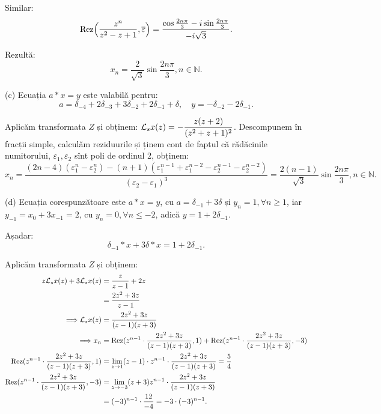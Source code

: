 Similar: 
\[
  \mathrm{Rez} \Big( \dfrac{z^n}{z^2 - z + 1}, \overline{\varepsilon} \Big) 
  = \dfrac{\cos \frac{2n\pi}{3} - i \sin \frac{2 n \pi}{3}}{-i\sqrt{3}}.
\]

Rezultă: 
\[
  x_n = \dfrac{2}{\sqrt{3}} \sin \dfrac{2n\pi}{3}, n \in \mathbb{N}.
\]

(c) Ecuația $a \ast x = y$ este valabilă pentru: 
\[
  a = \delta_{-4} + 2 \delta_{-3} + 3 \delta_{-2} + 2 \delta_{-1} + \delta, 
  \quad y = -\delta_{-2} - 2 \delta_{-1}.
\]

Aplicăm transformata $Z$ și obținem: 
$\mathcal{L}_s x(z) = - \dfrac{z(z+2)}{(z^2 + z + 1)^2}$. Descompunem în fracții 
simple, calculăm reziduurile și ținem cont de faptul că rădăcinile numitorului, 
$\varepsilon_1, \varepsilon_2$ sînt poli de ordinul 2, obținem: 
\[
  x_n = \dfrac{(2n-4)(\varepsilon_1^n - \varepsilon_2^n) - 
    (n+1)(\varepsilon_1^{n-1} + \varepsilon_1^{n-2} - \varepsilon_2^{n-1} - 
    \varepsilon_2^{n-2})}{(\varepsilon_2 - \varepsilon_1)^3} 
  = \dfrac{2(n-1)}{\sqrt{3}} \sin \dfrac{2 n \pi}{3}, n \in \mathbb{N}.
\]

(d) Ecuația corespunzătoare este $a \ast x = y$, cu $a = \delta_{-1} + 3 \delta$ și 
$y_n = 1, \forall n \geq 1$, iar $y_{-1} = x_0 + 3 x_{-1} = 2$, cu 
$y_n = 0, \forall n \leq -2$, adică $y = 1 + 2 \delta_{-1}$.

Așadar: 
\[
  \delta_{-1} \ast x + 3 \delta \ast x = 1 + 2 \delta_{-1}.
\]

Aplicăm transformata $Z$ și obținem:
\begin{align*}
  z \mathcal{L}_s x(z) + 3 \mathcal{L}_s x(z) &= \dfrac{z}{z-1} + 2z \\
                                &= \dfrac{2z^2 + 3z}{z-1} \\
  \Longrightarrow \mathcal{L}_s x(z) &= \dfrac{2z^2 + 3z}{(z-1)(z+3)} \\
  \Longrightarrow x_n &= \mathrm{Rez}(z^{n-1} \cdot \dfrac{2z^2 + 3z}{(z-1)(z+3)}, 1) + 
                        \mathrm{Rez} (z^{n-1} \cdot \dfrac{2z^2 + 3z}{(z-1)(z+3)}, -3) \\
  \mathrm{Rez}(z^{n-1} \cdot \dfrac{2z^2 + 3z}{(z-1)(z+3)}, 1) &= \lim_{z \to 1} (z-1) 
                                                         \cdot z^{n-1} \cdot \dfrac{2z^2 + 3z}{(z-1)(z+3)} = \dfrac{5}{4} \\
  \mathrm{Rez}(z^{n-1} \cdot \dfrac{2z^2 + 3z}{(z-1)(z+3)}, -3) 
                                &= \lim_{z \to -3} (z+3) z^{n-1} \cdot \dfrac{2z^2 + 3z}{(z-1)(z+3)} \\
                                &= (-3)^{n-1} \cdot \dfrac{12}{-4} = -3 \cdot (-3)^{n-1}.	                              
\end{align*}


